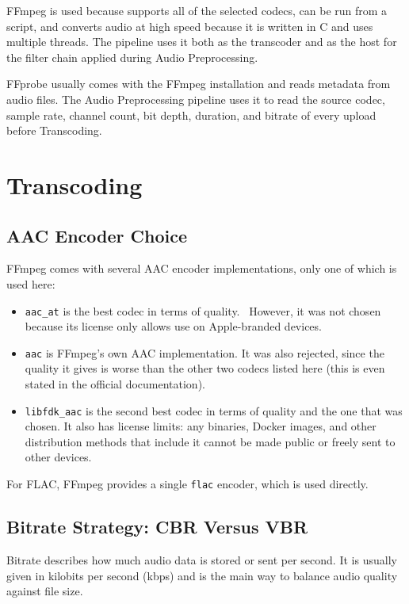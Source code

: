 FFmpeg is used because supports all of the selected codecs, can be run from a script,
and converts audio at high speed because it is written in C and uses
multiple threads. The pipeline uses it both as the transcoder and as
the host for the filter chain applied during Audio Preprocessing.

FFprobe usually comes with the FFmpeg installation and reads metadata from audio
files. The Audio Preprocessing pipeline uses it to read the source
codec, sample rate, channel count, bit depth, duration, and bitrate of
every upload before Transcoding.


\section{Transcoding}

\subsection{AAC Encoder Choice}
FFmpeg comes with several AAC encoder implementations, only one of
which is used here:
\begin{itemize}
    \item \texttt{aac\_at} is the best codec in terms of
    quality.~\parencite{aac_codec_cmp_1,aac_codec_cmp_2,aac_codec_cmp_3}
    However, it was not chosen because its license only allows use on
    Apple-branded devices.~\parencite{aac_at_licensing,ffmpeg_aac}
    \item \texttt{aac} is FFmpeg's own AAC implementation. It was
    also rejected, since the quality it gives is worse than the other
    two codecs listed here (this is even stated in the official
    documentation).~\parencite{aac_codec_cmp_1,aac_codec_cmp_2,aac_codec_cmp_3,ffmpeg_aac}
    \item \texttt{libfdk\_aac} is the second best codec in terms of
    quality and the one that was chosen. It also has license limits:
    any binaries, Docker images, and other distribution methods that
    include it cannot be made public or freely sent to other devices.~\parencite{vialicensing_aac,spdx_aac,ffmpeg_aac}
\end{itemize}
For FLAC, FFmpeg provides a single \texttt{flac} encoder, which is
used directly.~\parencite{ffmpeg_flac}

\subsection{Bitrate Strategy: CBR Versus VBR}
Bitrate describes how much audio data is stored or sent per second.
It is usually given in kilobits per second (kbps) and is the main way
to balance audio quality against file size.

